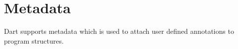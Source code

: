 \documentclass{article}
\begin{document}





\section{Metadata}

\LMHash{}
Dart supports metadata which is used to attach user defined annotations to program structures.  
\end{document}
